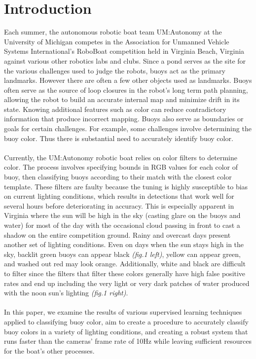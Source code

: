 \documentclass{article} %
\begin{document}
\section{Introduction}
Each summer, the autonomous robotic boat team UM:Autonomy at the University of Michigan competes in the Association for Unmanned Vehicle Systems International's RoboBoat competition held in Virginia Beach, Virginia against various other robotics labs and clubs. Since a pond serves as the site for the various challenges used to judge the robots, buoys act as the primary landmarks. However there are often a few other objects used as landmarks. Buoys often serve as the source of loop closures in the robot's long term path planning, allowing the robot to build an accurate internal map and minimize drift in its state. %
Knowing additional features such as color can reduce contradictory information that produce incorrect mapping. Buoys also serve as boundaries or goals for certain challenges. %
For example, some challenges involve determining the buoy color. Thus there is substantial need to accurately identify buoy color.
\\\\Currently, the UM:Autonomy robotic boat relies on color filters to determine color. The process involves specifying bounds in RGB values for each color of buoy, then classifying buoys according to their match with the closest color template. These filters are faulty because the tuning is highly susceptible to bias on current lighting conditions, which results in detections that work well for several hours before deteriorating in accuracy. This is especially apparent in Virginia where the sun will be high in the sky (casting glare on the buoys and water) for most of the day with the occasional cloud passing in front to cast a shadow on the entire competition ground. Rainy and overcast days present another set of lighting conditions. Even on days when the sun stays high in the sky, backlit green buoys can appear black \textit{(fig.1 left)}, yellow can appear green, and washed out red may look orange. Additionally, white and black are difficult to filter since the filters that filter these colors generally have high false positive rates and end up including the very light or very dark patches of water produced with the 
noon sun's lighting \textit{(fig.1 right)}.
\\\\In this paper, we examine the results of various supervised learning techniques applied to classifying buoy color, aim to create a procedure to accurately classify buoy colors in a variety of lighting conditions, and creating a robust system that runs faster than the cameras' frame rate of 10Hz while leaving sufficient resources for the boat's other processes.
\end{document}
